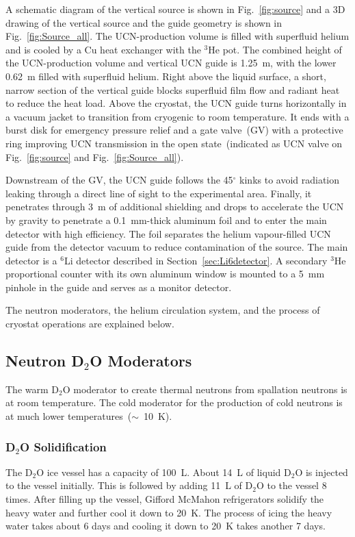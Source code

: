 A schematic diagram of the vertical source is shown in
Fig.~\ref{fig:source} and a 3D drawing of the vertical source and the
guide geometry is shown in Fig.~\ref{fig:Source_all}. The
UCN-production volume is filled with superfluid helium and is cooled
by a Cu heat exchanger with the $^3$He pot. The combined height of the
UCN-production volume and vertical UCN guide is 1.25~m, with the lower
0.62~m filled with superfluid helium. Right above the liquid surface,
a short, narrow section of the vertical guide blocks superfluid film
flow and radiant heat to reduce the heat load. Above the cryostat, the
UCN guide turns horizontally in a vacuum jacket to transition from
cryogenic to room temperature. It ends with a burst disk for emergency
pressure relief and a gate valve~(GV) with a protective ring improving
UCN transmission in the open state~(indicated as UCN valve on
Fig.~\ref{fig:source} and Fig.~\ref{fig:Source_all}).

Downstream of the GV, the UCN guide follows the 45$^\circ$ kinks to
avoid radiation leaking through a direct line of sight to the
experimental area. Finally, it penetrates through 3~m of additional
shielding and drops to accelerate the UCN by gravity to penetrate a
0.1~mm-thick aluminum foil and to enter the main detector with high
efficiency. The foil separates the helium vapour-filled UCN guide from
the detector vacuum to reduce contamination of the source. The main
detector is a $^6$Li detector described in
Section~\ref{sec:Li6detector}. A secondary $^3$He proportional counter
with its own aluminum window is mounted to a 5~mm pinhole in the guide
and serves as a monitor detector.




The neutron moderators, the helium circulation system, and the process
of cryostat operations are explained below.


\subsection{Neutron D$_2$O Moderators}
The warm D$_2$O moderator to create thermal neutrons from spallation
neutrons is at room temperature. The cold moderator for the production
of cold neutrons is at much lower temperatures~($\sim$~10~K).

\subsubsection{D$_2$O Solidification}
The D$_2$O ice vessel has a capacity of 100~L. About 14~L of liquid
D$_2$O is injected to the vessel initially. This is followed by adding
11~L of D$_2$O to the vessel 8 times.  After filling up the vessel,
Gifford McMahon refrigerators solidify the heavy water and further
cool it down to 20~K. The process of icing the heavy water takes about
6 days and cooling it down to 20~K takes another 7 days.


